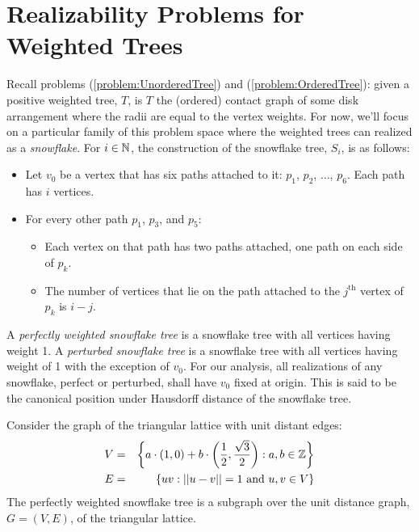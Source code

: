 \section{Realizability Problems for Weighted Trees}
Recall problems (\ref{problem:UnorderedTree}) and (\ref{problem:OrderedTree}): given a positive weighted tree, $T$, is $T$ the (ordered) contact graph of some disk arrangement where the radii are equal to the vertex weights.  For now, we'll focus on a particular family of this problem space where the weighted trees can realized as a \textit{snowflake}. For $i \in {\mathbb{N}}$, the construction of the snowflake tree, $S_i$, is as follows:
\begin{itemize}
\item Let $v_0$ be a vertex that has six paths attached to it: $p_1$, $p_2$, $\dots$, $p_6$.  Each path has $i$ vertices.
\item For every other path $p_1$, $p_3$, and $p_5$: 
	\begin{itemize}
		\item 	Each vertex on that path has two paths attached, one path on each side of $p_k$.
		\item		The number of vertices that lie on the path attached to the $j^\text{th}$ vertex of $p_k$ is $i-j$.
	\end{itemize}
\end{itemize}
A \textit{perfectly weighted snowflake tree} is a snowflake tree with all vertices having weight 1.  A \textit{perturbed snowflake tree} is a snowflake tree with all vertices having weight of 1 with the exception of $v_0$.  For our analysis, all realizations of any snowflake, perfect or perturbed, shall have $v_0$ fixed at origin.  This is said to be the canonical position under Hausdorff distance of the snowflake tree.   

Consider the graph of the triangular lattice with unit distant edges:
\begin{eqnarray*}
V &=& \left\lbrace a\cdot (1,0) + b \cdot \left(\frac{1}{2},\frac{\sqrt{3}}{2}\right) : a,b \in {\mathbb{Z}} \right\rbrace\\
E &=& \left\lbrace uv : \vert\vert u-v \vert\vert = 1 \text{ and } u,v \in V\right\rbrace
\end{eqnarray*}
The perfectly weighted snowflake tree is a subgraph over the unit distance graph, $G=(V,E)$, of the triangular lattice.


